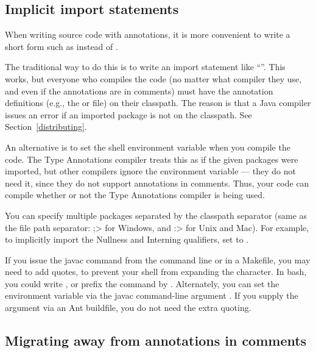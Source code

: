 \subsection{Implicit import statements\label{implicit-import-statements}}

When writing source code with annotations, it is more convenient to write a
short form such as  instead of
.

The traditional way to do this is to write an import statement like
``''.  This works, but everyone who
compiles the code (no matter what compiler they use, and even if the
annotations are in comments) must have the annotation definitions (e.g.,
the  or  file) on their
classpath.  The reason is that a Java compiler issues an error if an
imported package is not on the classpath.  See Section~\ref{distributing}.

\label{jsr308_imports}

An alternative is to set the shell environment variable
 when you compile the code.
The Type Annotations compiler treats this as if the given packages were
imported, but other compilers
ignore the
 environment variable --- they do not need it, since
they do not support annotations in comments.  Thus, your code can compile
whether or not the Type Annotations compiler is being used.

You can specify multiple packages separated by the classpath separator
(same as the file path separator:  \<;> for Windows, and \<:> for Unix and
Mac).  For example, to implicitly import the Nullness and Interning
qualifiers, set  to
.

If you issue the javac command from the command line or in a Makefile, you
may need to add quotes, to prevent your shell from expanding the \code{*}
character.
In bash, you could write , or prefix the 
command by  .
Alternately, you can set the environment variable via the javac
command-line argument .
If you supply the  argument via an Ant buildfile,
you do not need the extra quoting.


\subsection{Migrating away from annotations in comments}


